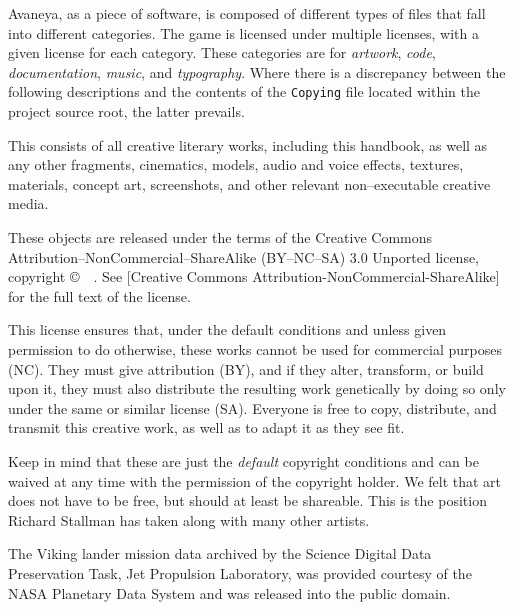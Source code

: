 

Avaneya, as a piece of software, is composed of different types of files that fall into different categories. The game is licensed under multiple licenses, with a given license for each category. These categories are for {\it artwork}, {\it code}, {\it documentation}, {\it music}, and {\it typography}. Where there is a discrepancy between the following descriptions and the contents of the {\tt Copying} file located within the project source root, the latter prevails.

\startitemize[4]

This consists of all creative literary works, including this handbook, as well as any other fragments, cinematics, models, audio and voice effects, textures, materials, concept art, screenshots, and other relevant non--executable creative media.

These objects are released under the terms of the Creative Commons Attribution--NonCommercial--ShareAlike (BY--NC--SA) 3.0 Unported license, copyright \copyright\ \CopyrightDates\ \CopyrightHolder. See [Creative Commons Attribution-NonCommercial-ShareAlike] for the full text of the license.

This license ensures that, under the default conditions and unless given permission to do otherwise, these works cannot be used for commercial purposes (NC). They must give attribution (BY), and if they alter, transform, or build upon it, they must also distribute the resulting work genetically by doing so only under the same or similar license (SA). Everyone is free to copy, distribute, and transmit this creative work, as well as to adapt it as they see fit. 

Keep in mind that these are just the {\it default} copyright conditions and can be waived at any time with the permission of the copyright holder. We felt that art does not have to be free, but should at least be shareable. This is the position Richard Stallman has taken along with many other artists.

The Viking lander mission data archived by the Science Digital Data Preservation Task, Jet Propulsion Laboratory, was provided courtesy of the NASA Planetary Data System and was released into the public domain.

